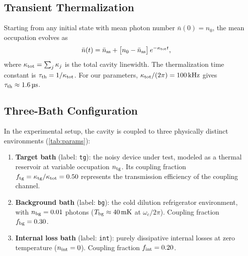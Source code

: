 \documentclass[11pt,a4paper]{article}
\newcommand{\nbar}{\bar{n}}
\newcommand{\kappat}{\kappa_{\rm tot}}
\newcommand{\kappatg}{\kappa_{\rm tg}}
\newcommand{\ntg}{n_{\rm tg}}
\newcommand{\nbg}{n_{\rm bg}}
\newcommand{\nss}{\nbar_{\rm ss}}
\begin{document}
\subsection{Transient Thermalization}
\label{sec:transient}

Starting from any initial state with mean photon number $\nbar(0) = n_0$,
the mean occupation evolves as
\begin{equation}
  \nbar(t) = \nss + \bigl[n_0 - \nss\bigr]\,e^{-\kappat t},
  \label{eq:transient}
\end{equation}
where $\kappat = \sum_j \kappa_j$ is the total cavity linewidth.
The thermalization time constant is $\tau_{\rm th} = 1/\kappat$.
For our parameters, $\kappat/(2\pi) = \SI{100}{kHz}$ gives
$\tau_{\rm th} \approx \SI{1.6}{\micro s}$.

\subsection{Three-Bath Configuration}
\label{sec:threebath}

In the experimental setup, the cavity is coupled to three physically
distinct environments (\cref{tab:params}):
\begin{enumerate}
  \item \textbf{Target bath} (label: \texttt{tg}): the noisy device under
        test, modeled as a thermal reservoir at variable occupation $\ntg$.
        Its coupling fraction $f_{\rm tg} = \kappatg/\kappat = 0.50$
        represents the transmission efficiency of the coupling channel.
  \item \textbf{Background bath} (label: \texttt{bg}): the cold dilution
        refrigerator environment, with $\nbg = 0.01$ photons
        ($T_{\rm bg} \approx \SI{40}{mK}$ at $\omega_c/2\pi$).
        Coupling fraction $f_{\rm bg} = 0.30$.
  \item \textbf{Internal loss bath} (label: \texttt{int}): purely dissipative
        internal losses at zero temperature ($n_{\rm int} = 0$).
        Coupling fraction $f_{\rm int} = 0.20$.
\end{enumerate}
\end{document}
